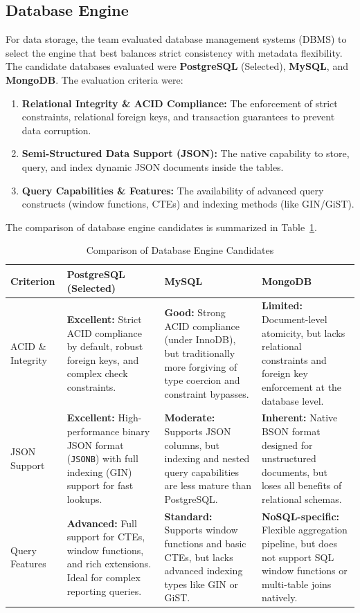 \documentclass[letterpaper%
, oneside%
, 12pt%
, memoireprojet%
, english%
,creativecommons,hyperref, withAlgo2e %
]{thETS}
\begin{document}
\subsection{Database Engine}
For data storage, the team evaluated database management systems (DBMS) to select the engine that best balances strict consistency with metadata flexibility. The candidate databases evaluated were \textbf{PostgreSQL} (Selected), \textbf{MySQL}, and \textbf{MongoDB}. The evaluation criteria were:
\begin{enumerate}
    \item \textbf{Relational Integrity \& ACID Compliance:} The enforcement of strict constraints, relational foreign keys, and transaction guarantees to prevent data corruption.
    \item \textbf{Semi-Structured Data Support (JSON):} The native capability to store, query, and index dynamic JSON documents inside the tables.
    \item \textbf{Query Capabilities \& Features:} The availability of advanced query constructs (window functions, CTEs) and indexing methods (like GIN/GiST).
\end{enumerate}

The comparison of database engine candidates is summarized in Table~\ref{tab:db_comparison}.

\begin{table}[H]
\centering
\begin{tabular}{|p{2.5cm}|p{4.2cm}|p{4.2cm}|p{4.2cm}|}
\hline
\textbf{Criterion} & \textbf{PostgreSQL (Selected)} & \textbf{MySQL} & \textbf{MongoDB} \\ \hline
ACID \& Integrity & \textbf{Excellent:} Strict ACID compliance by default, robust foreign keys, and complex check constraints. & \textbf{Good:} Strong ACID compliance (under InnoDB), but traditionally more forgiving of type coercion and constraint bypasses. & \textbf{Limited:} Document-level atomicity, but lacks relational constraints and foreign key enforcement at the database level. \\ \hline
JSON Support & \textbf{Excellent:} High-performance binary JSON format (\texttt{JSONB}) with full indexing (GIN) support for fast lookups. & \textbf{Moderate:} Supports JSON columns, but indexing and nested query capabilities are less mature than PostgreSQL. & \textbf{Inherent:} Native BSON format designed for unstructured documents, but loses all benefits of relational schemas. \\ \hline
Query Features & \textbf{Advanced:} Full support for CTEs, window functions, and rich extensions. Ideal for complex reporting queries. & \textbf{Standard:} Supports window functions and basic CTEs, but lacks advanced indexing types like GIN or GiST. & \textbf{NoSQL-specific:} Flexible aggregation pipeline, but does not support SQL window functions or multi-table joins natively. \\ \hline
\end{tabular}
\caption{Comparison of Database Engine Candidates}
\label{tab:db_comparison}
\end{table}
\end{document}
